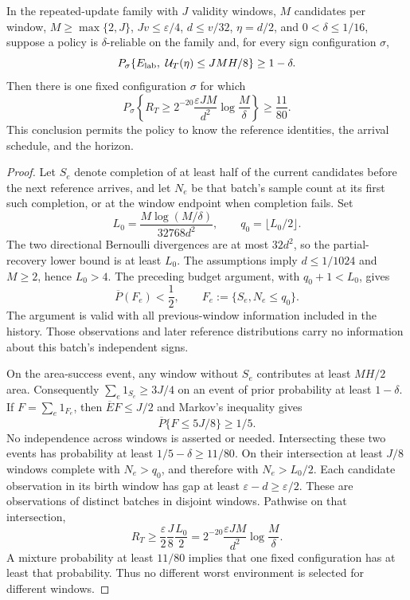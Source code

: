 \begin{theorem}
\label{thm:quantile_lower}
In the repeated-update family with $J$ validity windows, $M$ candidates per
window, $M\ge\max\{2,J\}$, $Jv\le\varepsilon/4$,
$d\le v/32$, $\eta=d/2$, and $0<\delta\le1/16$, suppose a policy is
$\delta$-reliable on the family and, for every sign configuration $\sigma$,
\[
 P_\sigma\{E_{\rm lab},\ \mathcal U_T(\eta)\le JMH/8\}\ge1-\delta.
\]
Then there is one fixed configuration $\sigma$ for which
\[
 P_\sigma\left\{R_T\ge
 2^{-20}\frac{\varepsilon JM}{d^2}\log\frac M\delta\right\}
 \ge\frac{11}{80}.
\]
This conclusion permits the policy to know the reference identities, the
arrival schedule, and the horizon.
\end{theorem}
\begin{proof}
Let $S_e$ denote completion of at least half of the current candidates before
the next reference arrives, and let $N_e$ be that batch's sample count at its
first such completion, or at the window endpoint when completion fails.
Set
\[
 L_0=\frac{M\log(M/\delta)}{32768d^2},\qquad
 q_0=\lfloor L_0/2\rfloor.
\]
The two directional Bernoulli divergences are at most $32d^2$, so the
partial-recovery lower bound is at least $L_0$. The assumptions imply
$d\le1/1024$ and $M\ge2$, hence $L_0>4$.
The preceding budget argument, with $q_0+1<L_0$, gives
\[
 \overline P(F_e)<\frac12,
 \qquad F_e:=\{S_e,N_e\le q_0\}.
\]
The argument is valid with all previous-window information included in the
history. Those observations and later reference distributions carry no
information about this batch's independent signs.

On the area-success event, any window without $S_e$ contributes at least
$MH/2$ area. Consequently $\sum_e1_{S_e}\ge3J/4$ on an event of prior
probability at least $1-\delta$. If $F=\sum_e1_{F_e}$, then
$\overline EF\le J/2$ and Markov's inequality gives
\[
 \overline P\{F\le5J/8\}\ge1/5.
\]
No independence across windows is asserted or needed. Intersecting these two
events has probability at least
$1/5-\delta\ge11/80$. On their intersection at least $J/8$ windows complete
with $N_e>q_0$, and therefore with $N_e>L_0/2$.
Each candidate observation in its birth window has gap at least
$\varepsilon-d\ge\varepsilon/2$. These are observations of distinct batches
in disjoint windows. Pathwise on that intersection,
\[
 R_T\ge\frac{\varepsilon}{2}\frac J8\frac{L_0}{2}
 =2^{-20}\frac{\varepsilon JM}{d^2}\log\frac M\delta.
\]
A mixture probability at least $11/80$ implies that one fixed configuration
has at least that probability. Thus no different worst environment is selected
for different windows.
\end{proof}


